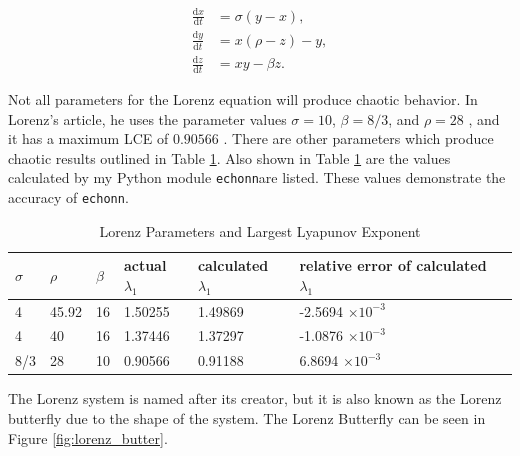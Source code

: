\documentclass{article}
\newcommand{\echonn}{\texttt{echonn}}
\newcommand{\echonnsp}{\texttt{echonn}\text{ }}
\newcommand{\der}[2][t]{\frac{\mathrm{d}#2}{\mathrm{d}#1}}
\begin{document}
\begin{align}
    \der{x} &= \sigma (y - x), \nonumber \\
    \der{y} &= x (\rho - z) - y, \nonumber \\
    \der{z} &= x y - \beta z. \label{eq:lorenz_equation}
\end{align}

Not all parameters for the Lorenz equation will produce chaotic behavior. In
Lorenz's article, he uses the parameter values $\sigma=10$, $\beta=8/3$, and
$\rho=28$ \cite{lorenz1963deterministic}, and it has a maximum LCE of
$0.90566$ \cite{viswanath1998lyapunov}. There are other parameters which
produce chaotic results outlined in Table \ref{table:lorenz_params}. Also
shown in Table \ref{table:lorenz_params} are the values calculated by my
Python module \echonnsp are listed. These values 
demonstrate the accuracy of \echonn.

\begin{table}[H]
    \centering
    \begin{tabular}{|l|l|l|l|l|l|l|}
        \hline
        $\sigma$ & $\rho$ & $\beta$ & actual $\lambda_1$ & calculated $\lambda_1$ & relative error of calculated $\lambda_1$ \\
        \hline \hline
        4 & 45.92 & 16 & 1.50255 & 1.49869 & -2.5694 $\times 10^{-3}$ \\ %
        4 & 40 & 16 & 1.37446 & 1.37297 & -1.0876 $\times 10^{-3}$ \\
        8/3 & 28 & 10 & 0.90566 & 0.91188 & 6.8694 $\times 10^{-3}$ \\
        \hline
    \end{tabular}
    \caption{
        Lorenz Parameters and Largest Lyapunov Exponent
        \cite{viswanath1998lyapunov}
    }
    \label{table:lorenz_params}
\end{table}


The Lorenz system is named after its creator, but it is also known as the
Lorenz butterfly due to the shape of the system. The Lorenz Butterfly can be
seen in Figure \ref{fig:lorenz_butter}.
\end{document}
